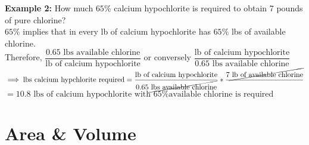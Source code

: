 \textbf{Example 2:} How much $65 \%$ calcium hypochlorite is required to obtain 7 pounds of pure chlorine?\\
$65 \%$ implies that in every lb of calcium hypochlorite has $65 \%$ lbs of available chlorine.\\
\vspace{0.2cm}
Therefore, $\dfrac{0.65 \textrm{ lbs available chlorine}}{\textrm{lb of calcium hypochlorite}} $ or conversely $\dfrac{\textrm{lb of calcium hypochlorite}}{0.65 \textrm{ lbs available chlorine}}$\\
\vspace{0.2cm}
$\implies{\textrm{lbs calcium hypchlorite required}}=\dfrac{\textrm{lb of calcium hypochlorite}}{0.65 \cancel{\textrm{ lbs available chlorine}}}*\dfrac{7\cancel{\textrm{ lb of available chlorine}}}{}$\\
\vspace{0.2cm}
$=\boxed{10.8 \textrm{ lbs of calcium hypochlorite with } 65\%\textrm{available chlorine is required}}$

\section{Area \& Volume}


